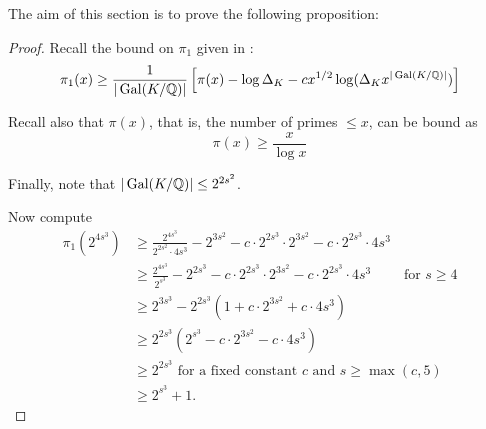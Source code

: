 The aim of this section is to prove the following proposition:

\boundnprimes*

\begin{proof}
Recall the bound on $\pi_{1}$ given in :
\[ \pi_{1}(x) \geq \frac{1}{|\operatorname{Gal}(K/\mathbb{Q})|} \left[ \pi(x) - \log \Delta_{K} - c x^{1/2} \log (\Delta_{K} x^{|\operatorname{Gal}(K/\mathbb{Q})|}) \right] \]

Recall also that $\pi(x)$, that is, the number of primes $\leq x$, can be bound as
\[ \pi(x) \geq \frac{x}{\log x} \]

Finally, 
note that $|\operatorname{Gal}(K/\mathbb{Q})| \leq 2^{2s^2}$.

Now compute
\begin{align*}
	\pi_{1}(2^{4s^3})
	&\geq \frac{2^{4s^3}}{2^{2s^2}\cdot 4s^3} - 2^{3s^2} - c\cdot 2^{2s^3} \cdot 2^{3 s^2} - c \cdot 2^{2s^3} \cdot 4 s^3\\
	&\geq \frac{2^{4s^3}}{2^{s^3}} - 2^{2s^3} - c\cdot 2^{2s^3} \cdot 2^{3 s^2} - c \cdot 2^{2s^3} \cdot 4 s^3 \quad \quad   \text{ for } s\geq 4 \\
	&\geq 2^{3s^3} - 2^{2s^3}(1 + c\cdot 2^{3s^2} + c \cdot 4s^3) \\
	&\geq 2^{2s^3}(2^{s^3} - c\cdot 2^{3s^2} - c \cdot 4s^3)\\
	&\geq 2^{2s^3} \text{ for a fixed constant } c \text { and } s \geq \max(c,5) \\
	&\geq 2^{s^3} + 1 .
\end{align*}


\end{proof}